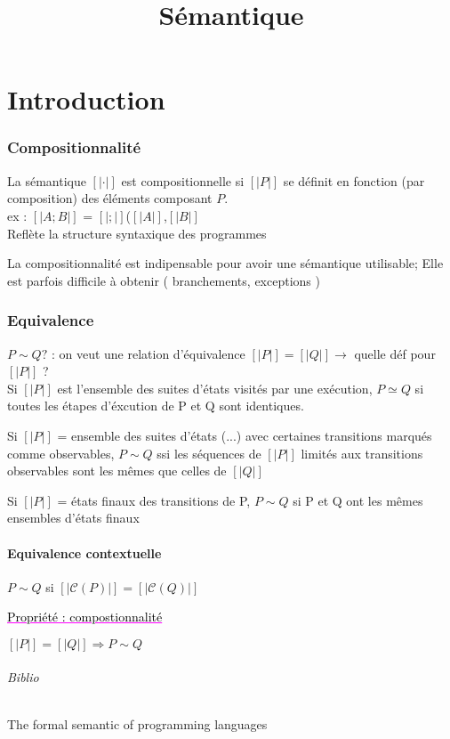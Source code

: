\documentclass[10pt,a4paper]{article}
\title{Sémantique}
\newenvironment{propriete}[1]{
	\subparagraph{ 	
		\textcolor{magenta}{
			\underline{ \textcolor{black}{Propriété : #1}} } }	} {}
\newcommand{\sem}[1]{$\left[| #1 | \right]$}
\newcommand{\semm}[1]{\left[| #1 | \right]}
\begin{document}
\part{Introduction}
\section{Compositionnalité}

La sémantique \sem{\cdot} est compositionnelle si \sem{P} se définit en fonction (par composition) des éléments composant $P$.\\
ex : \sem{A;B} = \sem{;}(\sem{A},\sem{B}\\
Reflète la structure syntaxique des programmes

La compositionnalité est indipensable pour avoir une sémantique utilisable;
Elle est parfois difficile à obtenir ( branchements, exceptions )



\section{Equivalence}
$P \sim Q ?$ : on veut une relation d'équivalence
$\semm{P} = \semm{Q} \rightarrow$ quelle déf pour \sem{P} ?\\

Si \sem{P} est l'ensemble des suites d'états visités par une exécution, $P \simeq Q$ si toutes les étapes d'éxcution de P et Q sont identiques.

Si \sem{P} = ensemble des suites d'états (...) avec certaines transitions marqués comme observables, $P \sim Q$ ssi les séquences de \sem{P} limités aux transitions observables sont les mêmes que celles de \sem{Q}

Si \sem{P} = états finaux des transitions de P, $P \sim Q$ si P et Q ont les mêmes ensembles d'états finaux

\subsection{Equivalence contextuelle}
$P \sim Q$ si $\semm{\mathcal{C}(P)} = \semm{\mathcal{C}(Q)}$
\begin{propriete}{compostionnalité}
$\semm P = \semm Q  \Rightarrow P \sim Q$
\end{propriete}
\paragraph{Biblio}
The formal semantic of programming languages
\end{document}

